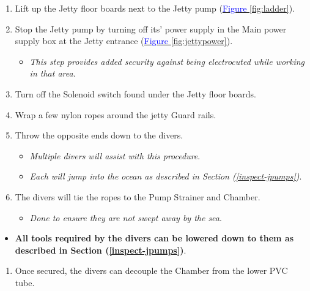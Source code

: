 \documentclass[
  12pt,
]{report}
\providecommand{\tightlist}{%
  \setlength{\itemsep}{0pt}\setlength{\parskip}{0pt}}\usepackage{longtable,booktabs,array}
\begin{document}
\begin{enumerate}
\def\labelenumi{\arabic{enumi}.}
\tightlist
\item
  Lift up the Jetty floor boards next to the Jetty pump
  (\ul{\textcolor{blue}{Figure \ref{fig:ladder}}}).
\item
  Stop the Jetty pump by turning off its' power supply in the Main power
  supply box at the Jetty entrance
  (\ul{\textcolor{blue}{Figure \ref{fig:jettypower}}}).

  \begin{itemize}
  \tightlist
  \item
    \emph{This step provides added security against being electrocuted
    while working in that area}.
  \end{itemize}
\item
  Turn off the Solenoid switch found under the Jetty floor boards.
\item
  Wrap a few nylon ropes around the jetty Guard rails.
\item
  Throw the opposite ends down to the divers.

  \begin{itemize}
  \tightlist
  \item
    \emph{Multiple divers will assist with this procedure}.
  \item
    \emph{Each will jump into the ocean as described in Section
    (\ul{\textcolor{blue}{\ref{inspect-jpumps}}})}.
  \end{itemize}
\item
  The divers will tie the ropes to the Pump Strainer and Chamber.

  \begin{itemize}
  \tightlist
  \item
    \emph{Done to ensure they are not swept away by the sea}.
  \end{itemize}
\end{enumerate}

\begin{itemize}
\tightlist
\item
  \textbf{All tools required by the divers can be lowered down to them
  as described in Section
  (\ul{\textcolor{blue}{\ref{inspect-jpumps}}})}.
\end{itemize}

\begin{enumerate}
\def\labelenumi{\arabic{enumi}.}
\setcounter{enumi}{6}
\tightlist
\item
  Once secured, the divers can decouple the Chamber from the lower PVC
  tube.
\end{enumerate}
\end{document}
